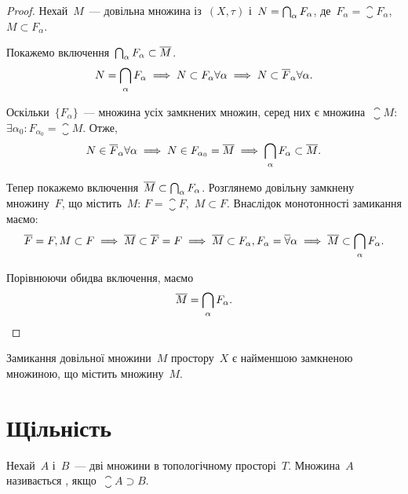 \begin{proof}
    Нехай~$M$~--- довільна множина із~$(X, \tau)$ і~$N = \operatorname*{\bigcap}_\alpha F_\alpha$, де~$F_\alpha = \closure F_\alpha$,~$M \subset F_\alpha$.

    Покажемо включення~$\operatorname*{\bigcap}_\alpha F_\alpha \subset \overline{M}$.
    \begin{equation*}
        N = \operatorname*{\bigcap}_\alpha F_\alpha \implies N \subset F_\alpha \forall \alpha \implies N \subset \overline{F}_\alpha \forall \alpha.
    \end{equation*}
    
    Оскільки~$\{F_\alpha\}$~--- множина усіх замкнених множин, серед них є множина~$\closure M$: $\exists \alpha_0: F_{\alpha_0} = \closure M$. Отже,
    \begin{equation*}
        N \in \overline{F}_\alpha \forall \alpha \implies N \in F_{\alpha_0} = \overline{M} \implies \operatorname*{\bigcap}_\alpha F_\alpha \subset \overline{M}.
    \end{equation*}
    
    Тепер покажемо включення~$\overline{M} \subset \operatorname*{\bigcap}_\alpha F_\alpha$. Розглянемо довільну замкнену множину~$F$, що містить~$M$: $F = \closure F$,~$M \subset F$. Внаслідок монотонності замикання маємо:
    \begin{equation*}
        \overline{F} = F, M \subset F \implies
        \overline{M} \subset \overline{F} = F \implies
        \overline{M} \subset F_\alpha, F_\alpha = \overline{\forall} \alpha \implies
        \overline{M} \subset \operatorname*{\bigcap}_\alpha F_\alpha.
    \end{equation*}
    
    Порівнюючи обидва включення, маємо
    \begin{equation*}
        \overline{M} = \operatorname*{\bigcap}_\alpha F_\alpha. \qedhere
    \end{equation*}
\end{proof}

\begin{corollary}
    Замикання довільної множини~$M$ простору~$X$ є найменшою замкненою множиною, що містить множину~$M$.
\end{corollary}

\section{Щільність}

\begin{definition}
    Нехай~$A$ і~$B$~--- дві множини в топологічному просторі~$T$. Множина~$A$ називається , якщо~$\closure A \supset B$.
\end{definition}


